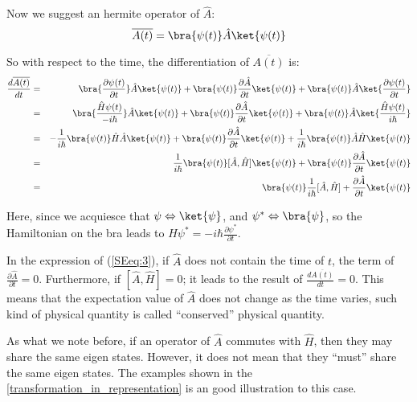 Now we suggest an hermite operator of $\hat{A}$:
\begin{equation}
\overline{A(t)} = \bra{\psi(t)}\hat{A}\ket{\psi(t)}
\end{equation}

So with respect to the time, the differentiation of
$\overline{A(t)}$ is:
\begin{eqnarray}\label{SEeq:3}
  \frac{d \overline{A(t)}}{dt} &=& \bra{\frac{\partial \psi(t)}{\partial t}}\hat{A}\ket{\psi(t)}
  + \bra{\psi(t)}\frac{\partial\hat{A}}{\partial t}\ket{\psi(t)} +
  \bra{\psi(t)}\hat{A}\ket{\frac{\partial \psi(t)}{\partial t}} \nonumber \\
    &=& \bra{\frac{\hat{H} \psi(t)}{-i\hbar}}\hat{A}\ket{\psi(t)}
  + \bra{\psi(t)}\frac{\partial\hat{A}}{\partial t}\ket{\psi(t)} +
  \bra{\psi(t)}\hat{A}\ket{\frac{\hat{H} \psi(t)}{i\hbar}}  \nonumber \\
    &=& -\frac{1}{i\hbar}\bra{\psi(t)}\hat{H}\hat{A}\ket{\psi(t)}
  + \bra{\psi(t)}\frac{\partial\hat{A}}{\partial t}\ket{\psi(t)}
  + \frac{1}{i\hbar}\bra{\psi(t)}\hat{A}\hat{H}\ket{\psi(t)}  \nonumber \\
    &=& \frac{1}{i\hbar}\bra{\psi(t)}[\hat{A},\hat{H}]\ket{\psi(t)}
    + \bra{\psi(t)}\frac{\partial\hat{A}}{\partial t}\ket{\psi(t)}  \nonumber \\
    &=& \bra{\psi(t)}\frac{1}{i\hbar}[\hat{A},\hat{H}]+\frac{\partial\hat{A}}{\partial t}\ket{\psi(t)}
\end{eqnarray}

Here, since we acquiesce that $\psi \Leftrightarrow \ket{\psi} $,
and $\psi^{*} \Leftrightarrow \bra{\psi} $, so the Hamiltonian on
the bra leads to $\hat{H}\psi^{*} = -i\hbar \frac{\partial
\psi^{*}}{\partial t}$.

In the expression of (\ref{SEeq:3}), if $\hat{A}$ does not contain
the time of $t$, the term of $\frac{\partial \hat{A}}{\partial t} =
0$. Furthermore, if $[\hat{A},\hat{H}] = 0$; it leads to the result
of $\frac{d \overline{A(t)}}{dt} = 0$. This means that the
expectation value of $\hat{A}$ does not change as the time varies,
such kind of physical quantity is called ``conserved'' physical
quantity.

As what we note before, if an operator of $\hat{A}$ commutes with
$\hat{H}$, then they may share the same eigen states. However, it
does not mean that they ``must'' share the same eigen states. The
examples shown in the \ref{transformation_in_representation} is an
good illustration to this case.

